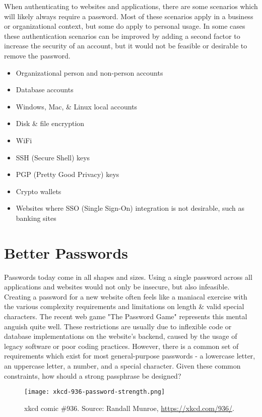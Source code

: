 \documentclass[
	a4paper, %
	10pt, %
	unnumberedsections, %
	twoside, %
]{LTJournalArticle}
\begin{document}
When authenticating to websites and applications, there are some scenarios which will likely always require a password. Most of these scenarios apply in a business or organizational context, but some do apply to personal usage. In some cases these authentication scenarios can be improved by adding a second factor to increase the security of an account, but it would not be feasible or desirable to remove the password.

\begin{itemize}
	\item Organizational person and non-person accounts
	\item Database accounts
	\item Windows, Mac, \& Linux local accounts
	\item Disk \& file encryption
	\item WiFi
	\item SSH (Secure Shell) keys
	\item PGP (Pretty Good Privacy) keys
	\item Crypto wallets
	\item Websites where SSO (Single Sign-On) integration is not desirable, such as banking sites
\end{itemize}

\section{Better Passwords}
Passwords today come in all shapes and sizes. Using a single password across all applications and websites would not only be insecure, but also infeasible. Creating a password for a new website often feels like a maniacal exercise with the various complexity requirements and limitations on length \& valid special characters. The recent web game "The Password Game" \autocite{passwordgame} represents this mental anguish quite well. These restrictions are usually due to inflexible code or database implementations on the website's backend, caused by the usage of legacy software or poor coding practices. However, there is a common set of requirements which exist for most general-purpose passwords - a lowercase letter, an uppercase letter, a number, and a special character. Given these common constraints, how should a strong passphrase be designed?

\begin{figure}[h]
	\texttt{[image: xkcd-936-password-strength.png]}
	\caption{xkcd comic \#936. Source: Randall Munroe, \href{https://xkcd.com/936/}{https://xkcd.com/936/}.}
\end{figure}
\end{document}
